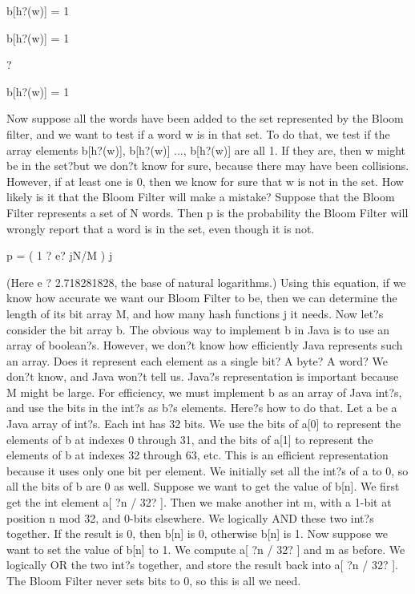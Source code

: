 b[h?(w)]  =  1

b[h?(w)]  =  1

?

b[h?(w)]  =  1

Now suppose all the words have been added to the set represented by the Bloom filter, and we want to test if a word w is in that set. To do that, we test if the array elements b[h?(w)], b[h?(w)] ..., b[h?(w)] are all 1. If they are, then w might be in the set?but we don?t know for sure, because there may have been collisions. However, if at least one is 0, then we know for sure that w is not in the set. 
      How likely is it that the Bloom Filter will make a mistake? Suppose that the Bloom Filter represents a set of N words. Then p is the probability the Bloom Filter will wrongly report that a word is in the set, even though it is not.

p = ( 1 ? e? jN/M ) j

(Here e ? 2.718281828, the base of natural logarithms.) Using this equation, if we know how accurate we want our Bloom Filter to be, then we can determine the length of its bit array M, and how many hash functions j it needs. 
      Now let?s consider the bit array b. The obvious way to implement b in Java is to use an array of boolean?s. However, we don?t know how efficiently Java represents such an array. Does it represent each element as a single bit? A byte? A word? We don?t know, and Java won?t tell us. Java?s representation is important because M might be large. For efficiency, we must implement b as an array of Java int?s, and use the bits in the int?s as b?s elements. 
      Here?s how to do that. Let a be a Java array of int?s. Each int has 32 bits. We use the bits of a[0] to represent the elements of b at indexes 0 through 31, and the bits of a[1] to represent the elements of b at indexes 32 through 63, etc. This is an efficient representation because it uses only one bit per element. We initially set all the int?s of a to 0, so all the bits of b are 0 as well. 
      Suppose we want to get the value of b[n]. We first get the int element a[ ?n / 32? ]. Then we make another int m, with a 1-bit at position n mod 32, and 0-bits elsewhere. We logically AND these two int?s together. If the result is 0, then b[n] is 0, otherwise b[n] is 1. 
      Now suppose we want to set the value of b[n] to 1. We compute a[ ?n / 32? ] and m as before. We logically OR the two int?s together, and store the result back into a[ ?n / 32? ]. The Bloom Filter never sets bits to 0, so this is all we need.

